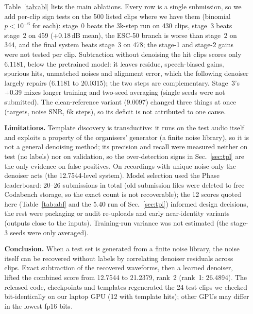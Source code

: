 \documentclass[conference]{IEEEtran}
\begin{document}
Table~\ref{tab:abl} lists the main ablations. Every row is a single submission, so we add per-clip sign tests on the
500 listed clips where we have them (binomial $p<10^{-6}$ for each): stage~0 beats the 3k-step run on 430 clips,
stage~3 beats stage~2 on 459 (+0.18\,dB mean), the ESC-50 branch is worse than stage~2 on 344, and the final system
beats stage~3 on 478; the stage-1 and stage-2 gains were not tested per clip. Subtraction without denoising the hit
clips scores only 6.1181, below the pretrained model: it leaves residue, speech-biased gains, spurious hits,
unmatched noises and alignment error, which the following denoiser largely repairs (6.1181 to 20.0315); the two
steps are complementary. Stage~3's +0.39 mixes longer training and two-seed averaging (single seeds were not
submitted). The clean-reference variant (9.0097) changed three things at once (targets, noise SNR, 6k steps), so
its deficit is not attributed to one cause.

\textbf{Limitations.} Template discovery is transductive: it runs on the test audio itself and exploits a property
of the organisers' generator (a finite noise library), so it is not a general denoising method; its precision and
recall were measured neither on test (no labels) nor on validation, so the over-detection signs in
Sec.~\ref{sec:tpl} are the only evidence on false positives. On recordings with unique noise only the denoiser acts
(the 12.7544-level system). Model selection used the Phase leaderboard: 20--26 submissions in total
(old submission files were deleted to free Codabench storage, so the exact count is not recoverable); the 12 scores
quoted here (Table~\ref{tab:abl} and the 5.40 run of Sec.~\ref{sec:tpl}) informed design decisions, the rest were
packaging or audit re-uploads and early near-identity variants (outputs close to the inputs). Training-run variance was not estimated (the stage-3 seeds were only averaged).

\textbf{Conclusion.} When a test set is generated from a finite noise library, the noise itself can be recovered
without labels by correlating denoiser residuals across clips. Exact subtraction of the recovered waveforms, then a
learned denoiser, lifted the combined score from 12.7544 to 21.2379, rank~2 (rank~1: 26.4894). The released code,
checkpoints and templates regenerated the 24 test clips we checked bit-identically on our laptop GPU (12 with
template hits); other GPUs may differ in the lowest fp16 bits.
\end{document}
